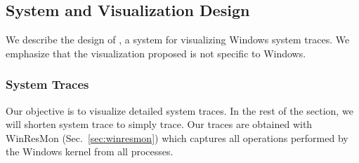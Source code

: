 \subsection{System and Visualization Design}


We describe the design of , a system for visualizing Windows system
traces.
We emphasize that the visualization proposed
is not specific to Windows.

\subsubsection{System Traces}
\label{sec:systrace}

Our objective is to visualize detailed system traces.
In the rest of the section, we will shorten system trace to simply trace.
Our traces are obtained with WinResMon (Sec.~\ref{sec:winresmon}) which
captures all operations performed by the Windows kernel
from all processes.

